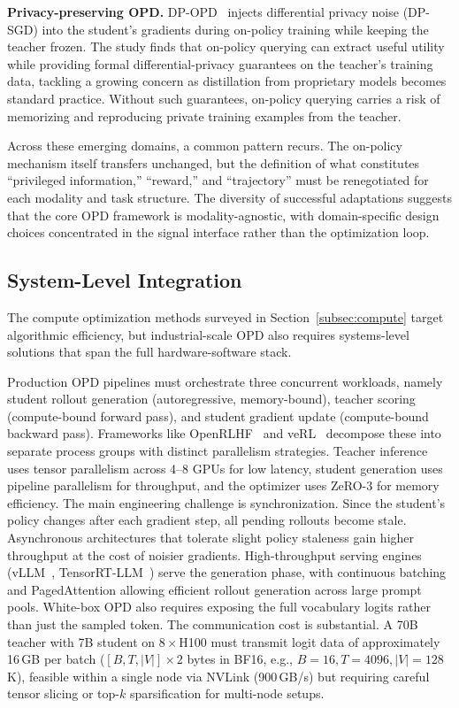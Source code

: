 \documentclass{article} %
\begin{document}
\textbf{Privacy-preserving OPD.} DP-OPD~\citep{2604.04461} injects differential privacy noise (DP-SGD) into the student's gradients during on-policy training while keeping the teacher frozen. The study finds that on-policy querying can extract useful utility while providing formal differential-privacy guarantees on the teacher's training data, tackling a growing concern as distillation from proprietary models becomes standard practice. Without such guarantees, on-policy querying carries a risk of memorizing and reproducing private training examples from the teacher.

Across these emerging domains, a common pattern recurs. The on-policy mechanism itself transfers unchanged, but the definition of what constitutes ``privileged information,'' ``reward,'' and ``trajectory'' must be renegotiated for each modality and task structure. The diversity of successful adaptations suggests that the core OPD framework is modality-agnostic, with domain-specific design choices concentrated in the signal interface rather than the optimization loop.

\subsection{System-Level Integration}
\label{subsec:systems}

The compute optimization methods surveyed in Section~\ref{subsec:compute} target algorithmic efficiency, but industrial-scale OPD also requires systems-level solutions that span the full hardware-software stack.

Production OPD pipelines must orchestrate three concurrent workloads, namely student rollout generation (autoregressive, memory-bound), teacher scoring (compute-bound forward pass), and student gradient update (compute-bound backward pass). Frameworks like OpenRLHF~\citep{2405.11143} and veRL~\citep{2409.19256} decompose these into separate process groups with distinct parallelism strategies. Teacher inference uses tensor parallelism across 4--8 GPUs for low latency, student generation uses pipeline parallelism for throughput, and the optimizer uses ZeRO-3 for memory efficiency. The main engineering challenge is synchronization. Since the student's policy changes after each gradient step, all pending rollouts become stale. Asynchronous architectures that tolerate slight policy staleness gain higher throughput at the cost of noisier gradients. High-throughput serving engines (vLLM~\citep{2309.06180}, TensorRT-LLM~\citep{nvidia2024tensorrtllm}) serve the generation phase, with continuous batching and PagedAttention allowing efficient rollout generation across large prompt pools. White-box OPD also requires exposing the full vocabulary logits rather than just the sampled token. The communication cost is substantial. A 70B teacher with 7B student on $8\times$H100 must transmit logit data of approximately 16\,GB per batch ($[B, T, |V|] \times 2$ bytes in BF16, e.g., $B{=}16, T{=}4096, |V|{=}128$K), feasible within a single node via NVLink (900\,GB/s) but requiring careful tensor slicing or top-$k$ sparsification for multi-node setups.
\end{document}
